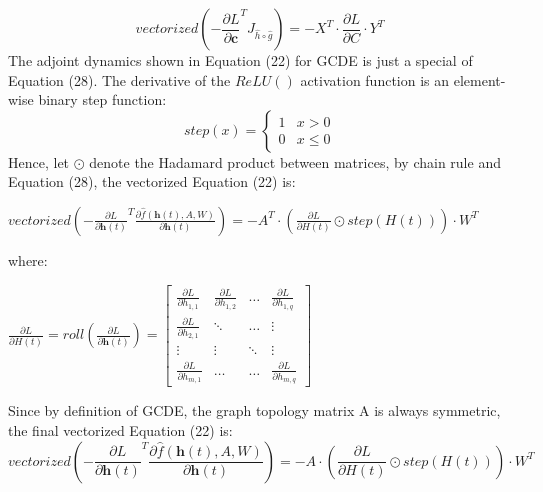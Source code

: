 \documentclass{article}
\begin{document}
\begin{equation}
    vectorized(-\frac{\partial L}{\partial \mathbf{c}}^{T} J_{\widehat{h}\circ\widehat{g}}) = -X^T \cdot \frac{\partial L}{\partial C} \cdot Y^T
\end{equation}
The adjoint dynamics shown in Equation (22) for GCDE is just a special of Equation (28). The derivative of the $ReLU()$ activation function is an element-wise binary step function:
\begin{equation}
    step(x)=
    \begin{cases} 
      1 & x>0 \\
      0 & x\leq 0 
   \end{cases}
\end{equation}
Hence, let $\odot$ denote the Hadamard product between matrices, by chain rule and Equation (28), the vectorized Equation (22) is:
\begin{center}
    $vectorized(-\frac{\partial L}{\partial \mathbf{h}(t)}^{T}  \frac{\partial \widehat{f}(\mathbf{h}(t), A, W)}{\partial \mathbf{h}(t)}) = 
    -A^T \cdot (\frac{\partial L}{\partial H(t)} \odot step(H(t)))\cdot W^T$
\end{center}
where:
\begin{center}
    $\frac{\partial L}{\partial H(t)} = roll(\frac{\partial L}{\partial \mathbf{h}(t)})=\begin{bmatrix}
        \frac{\partial L}{\partial h_{1,1}} & \frac{\partial L}{\partial h_{1,2}} & \hdots &\frac{\partial L}{\partial h_{1,q} } \\
        \frac{\partial L}{\partial h_{2,1}} & \ddots & \hdots &\vdots \\
        \vdots & \vdots & \ddots & \vdots\\
        \frac{\partial L}{\partial h_{m,1}} & \hdots & \hdots &\frac{\partial L}{\partial h_{m,q}}
    \end{bmatrix}$
\end{center}
Since by definition of GCDE, the graph topology matrix A is always symmetric, the final vectorized Equation (22) is:
\begin{equation}
 vectorized(-\frac{\partial L}{\partial \mathbf{h}(t)}^{T}  \frac{\partial \widehat{f}(\mathbf{h}(t), A, W)}{\partial \mathbf{h}(t)}) = 
    -A \cdot (\frac{\partial L}{\partial H(t)} \odot step(H(t)))\cdot W^T
\end{equation}
\end{document}

